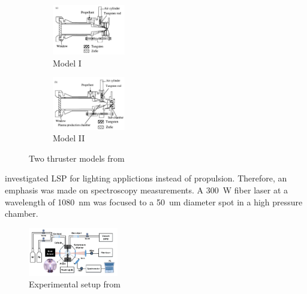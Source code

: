         \begin{figure}[h]
            \centering
            \begin{subfigure}[t]{0.45\textwidth}
                \centering
                \includegraphics[width=0.35\textwidth]{assets/2 background/Toyoda apparatus model 1.jpg}
                \caption{Model I}
                \label{fig:Toyoda apparatus 1}
            \end{subfigure}
            \hfill
            \begin{subfigure}[t]{0.45\textwidth}
                \centering
                \includegraphics[width=0.35\textwidth]{assets/2 background/Toyoda Apparatus model 2.png}
                \caption{Model II}
                \label{fig:Toyoda apparatus 2}
            \end{subfigure}
            \caption{Two thruster models from \textcite{toyodaThrustPerformanceCW2002}}
        \end{figure}



        \textcite{luCharacteristicDiagnosticsLaserStabilized2022a} investigated LSP for lighting applictions instead of propulsion. Therefore, an emphasis was made on spectroscopy measurements. A \qty{300}{W} fiber laser at a wavelength of \qty{1080}{nm} was focused to a \qty{50}{um} diameter spot in a high pressure chamber.
        
        \begin{figure}[h]
            \centering
            \includegraphics[width=0.35\textwidth]{assets/2 background/Lu apparatus.png}
            \caption{Experimental setup from \textcite{luCharacteristicDiagnosticsLaserStabilized2022a}}
            \label{fig:Lu apparatus}
        \end{figure}

